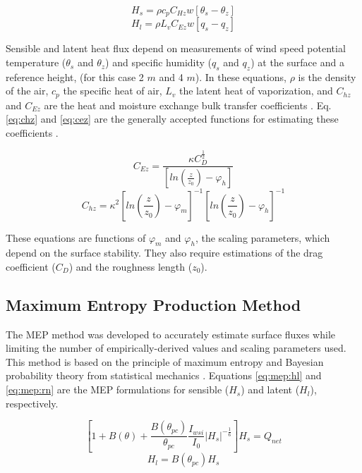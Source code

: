 \begin{equation}\label{eq:hs}
H_{s} = \rho c_{p} C_{Hz} w [\theta_{s} - \theta_{z}]
\end{equation}
\begin{equation}\label{eq:hl}
H_{l} = \rho L_{v} C_{Ez} w [q_{s} - q_{z}] 
\end{equation}

Sensible and latent heat flux depend on measurements of wind speed potential temperature ($\theta_{s}$ and $\theta_{z}$) and specific humidity ($q_{s}$ and $q_{z}$) at the surface and a reference height, (for this case 2 $m$ and 4 $m$). In these equations, $\rho$ is the density of the air, $c_{p}$ the specific heat of air, $L_{v}$ the latent heat of vaporization, and $C_{hz}$ and $C_{Ez}$ are the heat and moisture exchange bulk transfer coefficients \citep{foken:2008, andreas:311}. Eq. \ref{eq:chz} and \ref{eq:cez} are the generally accepted functions for estimating these coefficients \citep{foken:2008}. 

\begin{equation}\label{eq:cez}
C_{Ez} = \frac{\kappa C_{D}^{\frac{1}{2}}}{[ln(\frac{z}{z_{0}})-\varphi_{h}]}
\end{equation}
\begin{equation}\label{eq:chz}
C_{hz} =  \kappa^{2} \left[ ln \left( \frac{z}{z_{0}} \right) - \varphi_{m} \right] ^{-1} \left[ ln \left( \frac{z}{z_{0}} \right) - \varphi_{h} \right] ^{-1}
\end{equation}

These equations are functions of $\varphi_{m}$ and $\varphi_{h}$, the scaling parameters, which depend on the surface stability. They also require estimations of the drag coefficient ($C_{D}$) and the roughness length ($z_{0}$).

\subsection{Maximum Entropy Production Method} 
The MEP method was developed to accurately estimate surface fluxes while limiting the number of empirically-derived values and scaling parameters used. This method is based on the principle of maximum entropy and Bayesian probability theory from statistical mechanics \citep{wang:2014}. Equations \ref{eq:mep:hl} and \ref{eq:mep:rn} are the MEP formulations for sensible ($H_{s}$) and latent ($H_{l}$), respectively. 

\begin{equation}\label{eq:mep:rn}
\left[ 1 + B(\theta) + \frac{B(\theta_{pc})}{\theta_{pc}} \frac{I_{wsi}}{I_{0}} | H_{s} | ^{-\frac{1}{6}} \right] H_{s} = Q_{net}
\end{equation}
\begin{equation}\label{eq:mep:hl}
H_{l} = B(\theta_{pc}) H_{s}
\end{equation}


